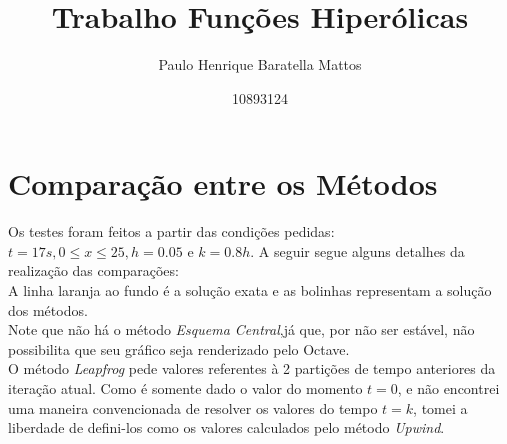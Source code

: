 \documentclass{article}
\title{Trabalho Funções Hiperólicas}
\author{Paulo Henrique Baratella Mattos}
\date{10893124}
\begin{document}
\maketitle

\section{Comparação entre os Métodos}
Os testes foram feitos a partir das condições pedidas: $t = 17s, 0\leq  x\leq 25, h=0.05$ e $k = 0.8h$. A seguir segue alguns detalhes da realização das comparações:\\
A linha laranja ao fundo é a solução exata e as bolinhas representam a solução dos métodos.\\ 
Note que não há o método \textit{Esquema Central},já que, por não ser estável, não possibilita que seu gráfico seja renderizado pelo Octave.\\
O método \textit{Leapfrog} pede valores referentes à 2 partições de tempo anteriores da iteração atual. Como é somente dado o valor do momento $t=0$, e não encontrei uma maneira convencionada de resolver os valores do tempo $t=k$, tomei a liberdade de defini-los como os valores calculados pelo método \textit{Upwind}.
\end{document}
